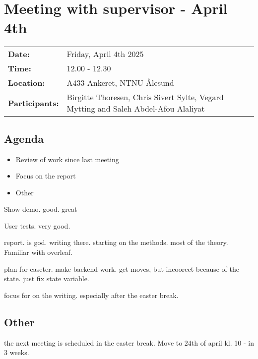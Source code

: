 \section{Meeting with supervisor - April 4th}
\begin{tabular}{ll}
    \textbf{Date:} & Friday, April 4th 2025 \\
    \textbf{Time:} & 12.00 - 12.30\\
    \textbf{Location:} & A433 Ankeret, NTNU Ålesund \\
    \textbf{Participants:} & Birgitte Thoresen, Chris Sivert Sylte, Vegard Mytting and Saleh Abdel-Afou Alaliyat\\
\end{tabular}

\vspace{0.5cm}

\subsection{Agenda}

\begin{itemize} 
    \item Review of work since last meeting 
    \item Focus on the report
    \item Other
\end{itemize}

Show demo. good. great

User tests. very good. 

report. is god. writing there. starting on the methods. most of the theory. Familiar with overleaf. 

plan for easeter. make backend work. get moves, but incoorect because of the state. just fix state variable. 

focus for on the writing. especially after the easter break. 

\subsection{Other}

the next meeting is scheduled in the easter break. Move to 24th of april kl. 10 - in 3 weeks. 


